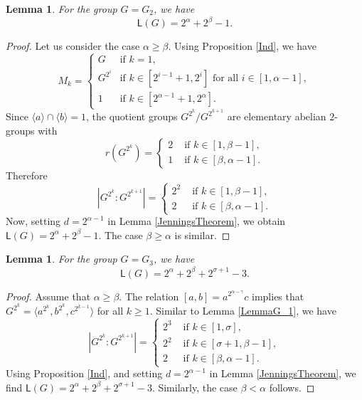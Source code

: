 \documentclass[a4paper,11pt]{article}
\numberwithin{equation}{section}
\newtheorem{lem}[thm]{Lemma}
\begin{document}
\begin{lem}\label{LemmaG_2} For the group $G=G_2$, we have
$$\mathsf{L}(G)=2^\alpha +2^\beta-1.$$
\end{lem}
\begin{proof}
Let us consider the case $\alpha\geq\beta.$ Using Proposition \ref{Ind}, we have 
$$M_k=
\begin{cases}
G &\mbox{if } k=1,\\
G^{2^i} &\mbox{if }  k \in [2^{i-1}+1, 2^i] \text{ for all } i \in [1, \alpha-1],\\
1 &\mbox{if }  k \in [2^{\alpha-1}+1, 2^{\alpha}].
\end{cases}
$$
Since $\langle a \rangle\cap \langle b\rangle=1$, the quotient groups $G^{2^k}/G^{2^{k+1}}$ are elementary abelian $2$-groups with
\begin{equation*}
  r(G^{2^k})=
  \begin{cases}
    2 & \text{ if }  k \in [1, \beta-1],\\
    1 & \text{ if }  k\in [\beta, \alpha-1].
  \end{cases}
\end{equation*}
Therefore
$$|G^{2^k}:G^{2^{k+1}}|=
\begin{cases}
2^2 &\mbox { if } k \in [1, \beta -1], \\
2 &\mbox { if } k \in [\beta, \alpha -1].
\end{cases}
$$
\noindent Now, setting $d=2^{\alpha-1}$ in Lemma \ref{JenningsTheorem}, we obtain $\mathsf{L}(G)= 2^\alpha +2^\beta-1$.
The case $\beta\geq \alpha$ is similar.  
\end{proof}



\begin{lem}\label{LemmaG_3} For the group $G=G_3$, we have
$$\mathsf{L}(G)= 2^\alpha +2^\beta+2^{\sigma+1}-3.$$ 
\end{lem}

\begin{proof}
Assume that $\alpha\geq\beta.$ The relation $[a,b]=a^{2^{\alpha-\gamma}} c$\; implies that $G^{2^k}= \langle a^{2^k}, b^{2^k}, c^{2^{k-1}} \rangle$ for all $k\geq 1.$ Similar to Lemma \ref{LemmaG_1}, we have
$$|G^{2^k}:G^{2^{k+1}}|=
\begin{cases}
2^3 &\mbox { if } k \in [1, \sigma], \\
2^2 &\mbox { if } k \in [\sigma +1, \beta -1], \\
2 &\mbox { if } k \in [\beta, \alpha -1].
\end{cases}
$$
Using Proposition \ref{Ind}, and setting $d=2^{\alpha-1}$ in Lemma \ref{JenningsTheorem}, we find $\mathsf{L}(G)= 2^\alpha +2^\beta+2^{\sigma+1}-3.$ Similarly, the case $\beta<\alpha$ follows.
\end{proof}
\end{document}
